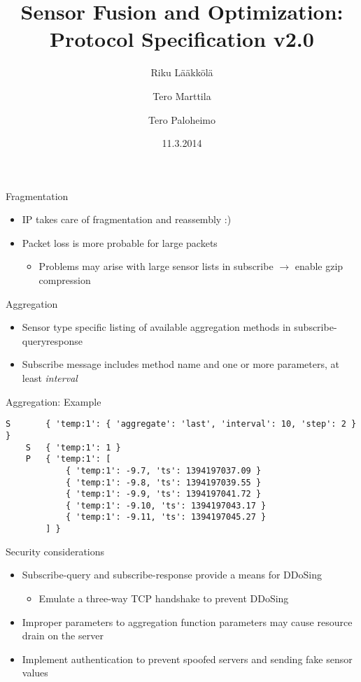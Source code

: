 \documentclass{beamer}
\title[SFO protocol]{Sensor Fusion and Optimization: Protocol Specification v2.0}
\author{Riku Lääkkölä \and Tero Marttila \and Tero Paloheimo}
\institute{Aalto ELEC}
\date{11.3.2014}
\begin{document}
\begin{frame}
\titlepage
\end{frame}

\begin{frame}{Fragmentation}
\begin{itemize}
\item IP takes care of fragmentation and reassembly :)
\item Packet loss is more probable for large packets
\begin{itemize}
\item Problems may arise with large sensor lists in subscribe $\rightarrow$ 
enable gzip compression
\end{itemize}
\end{itemize}
\end{frame}

\begin{frame}{Aggregation}
\begin{itemize}
\item Sensor type specific listing of available aggregation methods in subscribe-queryresponse
\item Subscribe message includes method name and one or more parameters, at least \emph{interval}
\end{itemize}
\end{frame}

\begin{frame}[fragile]{Aggregation: Example}
\footnotesize
\begin{verbatim}
S       { 'temp:1': { 'aggregate': 'last', 'interval': 10, 'step': 2 } }
    S   { 'temp:1': 1 }
    P   { 'temp:1': [
            { 'temp:1': -9.7, 'ts': 1394197037.09 }
            { 'temp:1': -9.8, 'ts': 1394197039.55 }
            { 'temp:1': -9.9, 'ts': 1394197041.72 }
            { 'temp:1': -9.10, 'ts': 1394197043.17 }
            { 'temp:1': -9.11, 'ts': 1394197045.27 }
        ] }
\end{verbatim}
\end{frame}

\begin{frame}{Security considerations}
\begin{itemize}
  \item Subscribe-query and subscribe-response provide a means for DDoSing
  \begin{itemize}
    \item Emulate a three-way TCP handshake to prevent DDoSing
  \end{itemize}
  \item Improper parameters to aggregation function parameters may cause
  resource drain on the server
  \item Implement authentication to prevent spoofed servers and sending fake
  sensor values
\end{itemize}
\end{frame}
\end{document}
